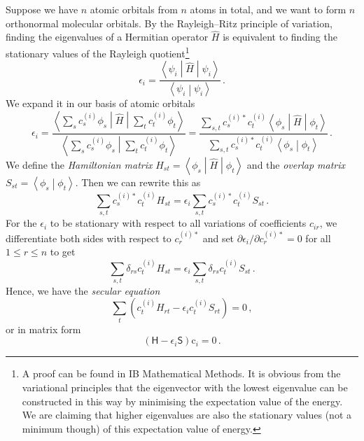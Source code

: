 \documentclass{article}
\theoremstyle{plain}\theoremheaderfont{\normalfont\itshape}\theorembodyfont{\rmfamily}\theoremseparator{.}\newtheorem*{rem}{Remark}\newtheorem*{ex}{Example}\newtheorem*{proof}{Proof}\newtheorem*{altp}{Alternative proof}
\theoremstyle{plain}\theoremheaderfont{\normalfont\bfseries}\theorembodyfont{\rmfamily}\theoremseparator{.}\newtheorem{thm}{Theorem}[section]\newtheorem{lem}[thm]{Lemma}\newtheorem{prop}[thm]{Proposition}\newtheorem*{cor}{Corollary}\newtheorem{defn}[thm]{Definition}\newtheorem{clm}[thm]{Claim}\newtheorem{clminproof}{Claim}\newtheorem{pos}{Postulate}[section]
\theoremstyle{break}\theoremheaderfont{\normalfont\itshape}\theorembodyfont{\rmfamily}\theoremseparator{.\medskip}\newtheorem*{proofskip}{Proof}\newtheorem*{exs}{Examples}\newtheorem*{rems}{Remarks}
\theoremstyle{break}\theoremheaderfont{\normalfont\bfseries}\theorembodyfont{\rmfamily}\theoremseparator{.\medskip}\newtheorem{lemskip}[thm]{Lemma}\newtheorem{defnskip}[thm]{Definition}\newtheorem{propskip}[thm]{Proposition}\newtheorem{thmskip}[thm]{Theorem}
\numberwithin{equation}{section}
\newcommand{\braket}[2]{\left\langle #1 \middle| #2 \right\rangle}
\newcommand{\expval}[2]{\left\langle #2 \middle| #1 \middle| #2 \right\rangle}
\newcommand{\mel}[3]{\left\langle #1 \middle| #2 \middle| #3 \right\rangle}
\newcommand{\vb}[1]{\bm{\mathrm{#1}}}
\begin{document}
    Suppose we have \(n\) atomic orbitals from \(n\) atoms in total, and we want to form \(n\) orthonormal molecular orbitals. By the Rayleigh--Ritz principle of variation, finding the eigenvalues of a Hermitian operator \(\hat{H}\) is equivalent to finding the stationary values of the Rayleigh quotient\footnote{A proof can be found in IB Mathematical Methods. It is obvious from the variational principles that the eigenvector with the lowest eigenvalue can be constructed in this way by minimising the expectation value of the energy. We are claiming that higher eigenvalues are also the stationary values (not a minimum though) of this expectation value of energy.}
    \begin{equation}
        \epsilon_i=\frac{\expval{\hat{H}}{\psi_i}}{\braket{\psi_i}{\psi_i}}\,.
    \end{equation}
    We expand it in our basis of atomic orbitals
    \begin{equation}
        \epsilon_i=\frac{\mel{\sum_s c_{s}^{(i)}\phi_s}{\hat{H}}{\sum_t c_{t}^{(i)}\phi_t}}{\braket{\sum_s c_{s}^{(i)}\phi_s}{\sum_t c_{t}^{(i)}\phi_t}}=\frac{\sum_{s,t}c_{s}^{(i)*}c_{t}^{(i)}\mel{\phi_s}{\hat{H}}{\phi_t}}{\sum_{s,t}c_{s}^{(i)*}c_{t}^{(i)}\braket{\phi_s}{\phi_t}}\,.
    \end{equation}
    We define the \textit{Hamiltonian matrix} \(H_{st}=\mel{\phi_s}{\hat{H}}{\phi_t}\) and the \textit{overlap matrix} \(S_{st}=\braket{\phi_s}{\phi_t}\). Then we can rewrite this as
    \begin{equation}
        \sum_{s,t}c_{s}^{(i)*}c_{t}^{(i)}H_{st}=\epsilon_i\sum_{s,t}c_{s}^{(i)*}c_{t}^{(i)}S_{st}\,.
    \end{equation}
    For the \(\epsilon_i\) to be stationary with respect to all variations of coefficients \(c_{ir}\), we differentiate both sides with respect to \(c_{r}^{(i)*}\) and set \(\partial \epsilon_i/\partial c_{r}^{(i)*}=0\) for all \(1\le r\le n\) to get
    \begin{equation}
        \sum_{s,t}\delta_{rs}c_{t}^{(i)}H_{st}=\epsilon_i\sum_{s,t}\delta_{rs}c_{t}^{(i)}S_{st}\,.
    \end{equation}
    Hence, we have the \textit{secular equation}
    \begin{equation}
        \sum_{t}(c_{t}^{(i)}H_{rt}-\epsilon_ic_{t}^{(i)}S_{rt})=0\,,
    \end{equation}
    or in matrix form
    \begin{equation}
        (\mathsf{H}-\epsilon_i\mathsf{S})\vb{c}_i=\vb{0}\,.
    \end{equation}
\end{document}
